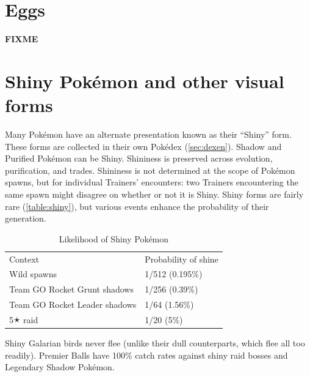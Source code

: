 
\section{Eggs}
\label{sec:eggs}
\textbf{FIXME}

\section{Shiny Pokémon and other visual forms}
\label{sec:shiny}
Many Pokémon have an alternate presentation known as their ``Shiny'' form.
These forms are collected in their own Pokédex (\autoref{sec:dexen}).
Shadow and Purified Pokémon can be Shiny.
Shininess is preserved across evolution, purification, and trades.
Shininess is not determined at the scope of Pokémon spawns, but for individual
  Trainers' encounters: two Trainers encountering the same spawn might disagree
  on whether or not it is Shiny.
Shiny forms are fairly rare (\autoref{table:shiny}), but various events
  enhance the probability of their generation.
\begin{table}[ht]
\begin{center}
\begin{tabular}{ll}
Context & Probability of shine \\
\Midrule
  Wild spawns & 1/512 (0.195\%) \\
  Team GO Rocket Grunt shadows & 1/256 (0.39\%) \\
  Team GO Rocket Leader shadows & 1/64 (1.56\%) \\
  5🟉 raid & 1/20 (5\%) \\
\end{tabular}
\end{center}
\caption{Likelihood of Shiny Pokémon}
\label{table:shiny}
\end{table}
Shiny Galarian birds never flee (unlike their dull counterparts, which flee all too readily).
Premier Balls have 100\% catch rates against shiny raid bosses and Legendary Shadow Pokémon.

